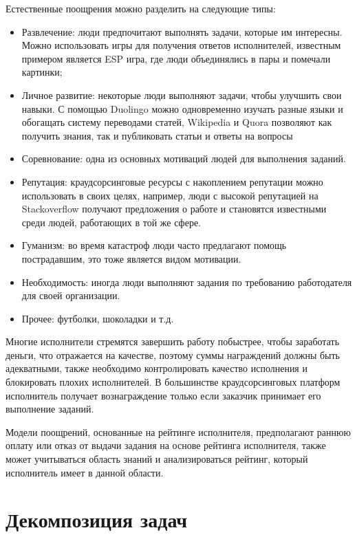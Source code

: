 \documentclass[specification,annotation,times]{itmo-student-thesis}
\begin{document}
Естественные поощрения можно разделить на следующие типы:
\begin{itemize}
    \item Развлечение: люди предпочитают выполнять задачи, которые им интересны. Можно использовать игры для получения ответов исполнителей, известным примером является ESP игра, где люди объединялись в пары и помечали картинки;
    \item Личное развитие: некоторые люди выполняют задачи, чтобы улучшить свои навыки. С помощью Duolingo можно одновременно изучать разные языки и обогащать систему переводами статей, Wikipedia и Quora позволяют как получить знания, так и публиковать статьи и ответы на вопросы
    \item Соревнование: одна из основных мотиваций людей для выполнения заданий.
    \item Репутация: краудсорсинговые ресурсы с накоплением репутации можно использовать в своих целях, например, люди с высокой репутацией на Stackoverflow получают предложения о работе и становятся известными среди людей, работающих в той же сфере.
    \item Гуманизм: во время катастроф люди часто предлагают помощь пострадавшим, это тоже является видом мотивации.
    \item Необходимость: иногда люди выполняют задания по требованию работодателя для своей организации.
    \item Прочее: футболки, шоколадки и т.д.
\end{itemize}

Многие исполнители стремятся завершить работу побыстрее, чтобы заработать деньги, что отражается на качестве, поэтому суммы награждений должны быть адекватными, также необходимо контролировать качество исполнения и блокировать плохих исполнителей. В большинстве краудсорсинговых платформ исполнитель получает вознаграждение только если заказчик принимает его выполнение заданий.

Модели поощрений, основанные на рейтинге исполнителя, предполагают раннюю оплату или отказ от выдачи задания на основе рейтинга исполнителя, также может учитываться область знаний и анализироваться рейтинг, который исполнитель имеет в данной области.

\section{Декомпозиция задач}
\end{document}
